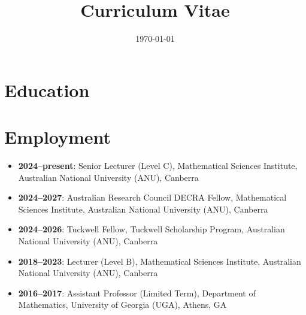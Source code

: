 \documentclass[a4paper]{moderncv}
\date{\today}
\title{Curriculum Vitae}
\begin{document}
\maketitle

\section*{Education}
\label{sec:org22a503e}

\section*{Employment}
\label{sec:orgaa9e1c5}
\begin{itemize}
\item \textbf{2024--present}: Senior Lecturer (Level C), Mathematical Sciences Institute, Australian National University (ANU), Canberra
\item \textbf{2024--2027}: Australian Research Council DECRA Fellow, Mathematical Sciences Institute, Australian National University (ANU), Canberra
\item \textbf{2024--2026}: Tuckwell Fellow, Tuckwell Scholarship Program, Australian National University (ANU), Canberra
\item \textbf{2018--2023}: Lecturer (Level B), Mathematical Sciences Institute, Australian National University (ANU), Canberra
\item \textbf{2016--2017}: Assistant Professor (Limited Term), Department of Mathematics, University of Georgia (UGA), Athens, GA
\end{itemize}
\end{document}
